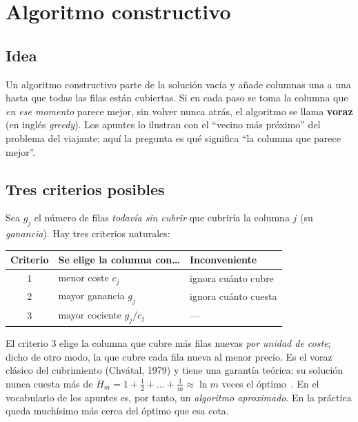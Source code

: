 \section{Algoritmo constructivo}\label{sec:constructivo}

\subsection{Idea}

Un algoritmo constructivo parte de la solución vacía y añade columnas una a una hasta que
todas las filas están cubiertas. Si en cada paso se toma la columna que \emph{en ese momento}
parece mejor, sin volver nunca atrás, el algoritmo se llama \textbf{voraz} (en inglés
\emph{greedy}). Los apuntes lo ilustran con el ``vecino más próximo'' del problema del
viajante; aquí la pregunta es qué significa ``la columna que parece mejor''.

\subsection{Tres criterios posibles}

Sea $g_j$ el número de filas \emph{todavía sin cubrir} que cubriría la columna $j$ (su
\emph{ganancia}). Hay tres criterios naturales:
\begin{center}
\begin{tabular}{@{}cll@{}}
\toprule
Criterio & Se elige la columna con\ldots & Inconveniente \\ \midrule
1 & menor coste $c_j$ & ignora cuánto cubre \\
2 & mayor ganancia $g_j$ & ignora cuánto cuesta \\
3 & mayor cociente $g_j/c_j$ & --- \\
\bottomrule
\end{tabular}
\end{center}
El criterio 3 elige la columna que cubre más filas nuevas \emph{por unidad de coste}; dicho
de otro modo, la que cubre cada fila nueva al menor precio. Es el voraz clásico del
cubrimiento (Chvátal, 1979) y tiene una garantía teórica: su solución nunca cuesta más de
$H_m = 1+\tfrac12+\dots+\tfrac1m \approx \ln m$ veces el óptimo~\cite[sec.~2.3]{kordalewski}.
En el vocabulario de los apuntes es, por tanto, un \emph{algoritmo aproximado}. En la
práctica queda muchísimo más cerca del óptimo que esa cota.


